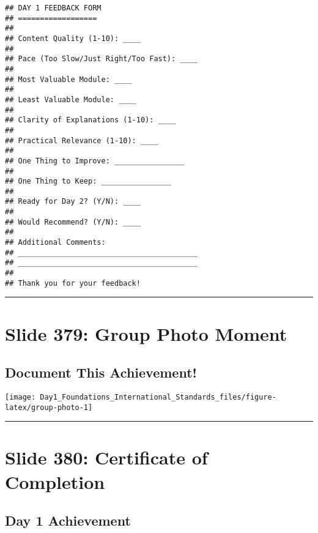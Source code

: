 \documentclass[
]{article}
\begin{document}
\begin{verbatim}
## DAY 1 FEEDBACK FORM
## ==================
## 
## Content Quality (1-10): ____ 
## 
## Pace (Too Slow/Just Right/Too Fast): ____ 
## 
## Most Valuable Module: ____ 
## 
## Least Valuable Module: ____ 
## 
## Clarity of Explanations (1-10): ____ 
## 
## Practical Relevance (1-10): ____ 
## 
## One Thing to Improve: ________________ 
## 
## One Thing to Keep: ________________ 
## 
## Ready for Day 2? (Y/N): ____ 
## 
## Would Recommend? (Y/N): ____ 
## 
## Additional Comments:
## _________________________________________
## _________________________________________
## 
## Thank you for your feedback!
\end{verbatim}

\begin{center}\rule{0.5\linewidth}{0.5pt}\end{center}

\section{Slide 379: Group Photo
Moment}\label{slide-379-group-photo-moment}

\subsection{Document This Achievement!}\label{document-this-achievement}

\texttt{[image: Day1\_Foundations\_International\_Standards\_files/figure-latex/group-photo-1]}

\begin{center}\rule{0.5\linewidth}{0.5pt}\end{center}

\section{Slide 380: Certificate of
Completion}\label{slide-380-certificate-of-completion}

\subsection{Day 1 Achievement}\label{day-1-achievement}
\end{document}
